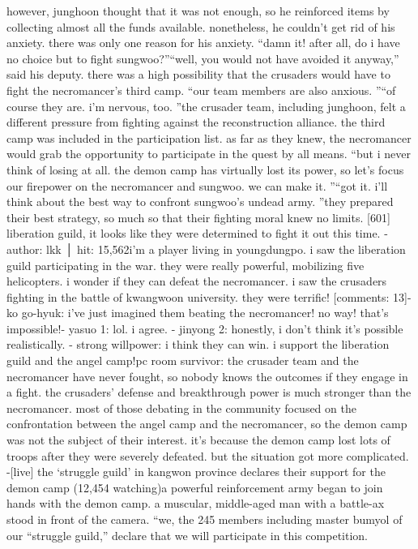 however, junghoon thought that it was not enough, so he reinforced items by collecting almost all the funds available.
 nonetheless, he couldn’t get rid of his anxiety.
there was only one reason for his anxiety.
“damn it! after all, do i have no choice but to fight sungwoo?”“well, you would not have avoided it anyway,” said his deputy.
there was a high possibility that the crusaders would have to fight the necromancer’s third camp.
“our team members are also anxious.
”“of course they are.
 i’m nervous, too.
”the crusader team, including junghoon, felt a different pressure from fighting against the reconstruction alliance.
the third camp was included in the participation list.
 as far as they knew, the necromancer would grab the opportunity to participate in the quest by all means.
“but i never think of losing at all.
 the demon camp has virtually lost its power, so let’s focus our firepower on the necromancer and sungwoo.
 we can make it.
”“got it.
 i’ll think about the best way to confront sungwoo’s undead army.
”they prepared their best strategy, so much so that their fighting moral knew no limits.
[601] liberation guild, it looks like they were determined to fight it out this time.
-author: lkk │ hit: 15,562i’m a player living in youngdungpo.
 i saw the liberation guild participating in the war.
 they were really powerful, mobilizing five helicopters.
i wonder if they can defeat the necromancer.
 i saw the crusaders fighting in the battle of kwangwoon university.
 they were terrific!
[comments: 13]- ko go-hyuk: i’ve just imagined them beating the necromancer! no way! that’s impossible!- yasuo 1: lol.
 i agree.
- jinyong 2: honestly, i don’t think it’s possible realistically.
- strong willpower: i think they can win.
 i support the liberation guild and the angel camp!pc room survivor: the crusader team and the necromancer have never fought, so nobody knows the outcomes if they engage in a fight.
 the crusaders’ defense and breakthrough power is much stronger than the necromancer.
most of those debating in the community focused on the confrontation between the angel camp and the necromancer, so the demon camp was not the subject of their interest.
it’s because the demon camp lost lots of troops after they were severely defeated.
but the situation got more complicated.
-[live] the ‘struggle guild’ in kangwon province declares their support for the demon camp (12,454 watching)a powerful reinforcement army began to join hands with the demon camp.
a muscular, middle-aged man with a battle-ax stood in front of the camera.
“we, the 245 members including master bumyol of our “struggle guild,” declare that we will participate in this competition.
